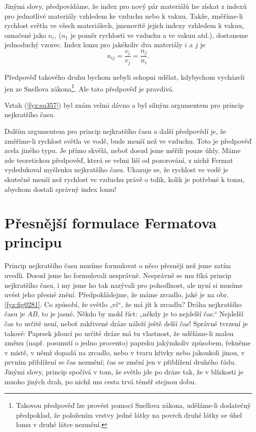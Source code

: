     Jinými slovy, předpovídáme, že index pro nový pár materiálů lze získat z indexů pro jednotlivé 
    materiály vzhledem ke vzduchu nebo k vakuu. Takže, změříme-li rychlost světla ve všech 
    materiálech, jmenovitě jejich indexy vzhledem k vakuu, označené jako \(n_i\), (\(n_1\) je poměr 
    rychlosti ve vzduchu a ve vakuu atd.), dostaneme jednoduchý vzorec. Index lomu pro jakékoliv 
    dva materiály \(i\) a \(j\) je
    \begin{equation}\label{fyz:eq358}
      n_{ij} = \frac{v_i}{v_j} = \frac{n_j}{n_i}.
    \end{equation}
    
    Předpověď takového druhu bychom nebyli schopni udělat, kdybychom vycházeli jen ze Snellova 
    zákona\footnote{Takovou předpověď lze provést pomocí Snellova zákona, uděláme-li dodatečný 
    předpoklad, že položením vrstvy jedné látky na povrch druhé látky se úhel lomu v druhé látce 
    nezmění.}. Ale tato předpověď je pravdivá.
    
    Vztah (\ref{fyz:eq357}) byl znám velmi dávno a byl silným argumentem pro princip nejkratšího 
    času.
    
    Dalším argumentem pro princip nejkratšího času a další předpovědí je, že změříme-li rychlost 
    světla ve vodě, bude menší než ve vzduchu. Toto je předpověď zcela jiného typu. Je přímo 
    skvělá, neboť dosud jsme měřili pouze úhly. Máme zde teoretickou předpověď, která se velmi liší 
    od pozorování, z nichž Fermat vydedukoval myšlenku nejkratšího času. Ukazuje se, že rychlost ve 
    vodě je skutečně menší než rychlost ve vzduchu právě o tolik, kolik je potřebné k tomu, abychom 
    dostali správný index lomu!
    
  \section{Přesnější formulace Fermatova principu}\label{fyz:IchapXXVIsecV}
    Princip nejkratšího času musíme formulovat o něco přesněji než jsme zatím uvedli. Dosud jsme ho 
    formulovali nesprávně. Nesprávně se mu říká princip nejkratšího času, i my jsme ho tak nazývali 
    pro pohodlnost, ale nyní si musíme uvést jeho přesné znění. Předpokládejme, že máme zrcadlo, 
    jaké je na obr. \ref{fyz:fig0281}. Co způsobí, že světlo „ví“, že má jít k zrcadlu? Dráha 
    nejkratšího času je \(AB\), to je jasné. Někdo by mohl říct: „někdy je to nejdelší čas.“ 
    Nejdelší čas to určitě není, neboť zakřivené dráze náleží ještě delší čas! Správné tvrzení je 
    takové: Paprsek jdoucí po určité dráze má tu vlastnost, že uděláme-li malou změnu (např. 
    posunutí o jedno procento) paprsku jakýmkoliv způsobem, řekněme v místě, v němž dopadá na 
    zrcadlo, nebo v tvaru křivky nebo jakoukoli jinou, v prvním přiblížení se čas nezmění; čas se 
    změní jen v přiblížení druhého řádu. Jinými slovy, princip spočívá v tom, že světlo jde po 
    dráze tak, že v blízkosti je mnoho jiných drah, po nichž mu cesta trvá téměř stejnou dobu.
    
